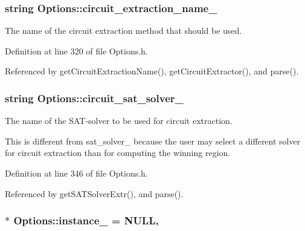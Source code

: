 \hypertarget{classOptions_a08739163aad2d558d5a96f1f27f4f7d8}{
\subsubsection[{circuit\-\_\-extraction\-\_\-name\-\_\-}]{\setlength{\rightskip}{0pt plus 5cm}string Options\-::circuit\-\_\-extraction\-\_\-name\-\_\-\hspace{0.3cm}{\ttfamily [protected]}}}\label{classOptions_a08739163aad2d558d5a96f1f27f4f7d8}


The name of the circuit extraction method that should be used. 



Definition at line 320 of file Options.\-h.



Referenced by get\-Circuit\-Extraction\-Name(), get\-Circuit\-Extractor(), and parse().

\hypertarget{classOptions_a1dc174bd99373a624a4643fd44225129}{
\subsubsection[{circuit\-\_\-sat\-\_\-solver\-\_\-}]{\setlength{\rightskip}{0pt plus 5cm}string Options\-::circuit\-\_\-sat\-\_\-solver\-\_\-\hspace{0.3cm}{\ttfamily [protected]}}}\label{classOptions_a1dc174bd99373a624a4643fd44225129}


The name of the S\-A\-T-\/solver to be used for circuit extraction. 

This is different from sat\-\_\-solver\-\_\- because the user may select a different solver for circuit extraction than for computing the winning region. 

Definition at line 346 of file Options.\-h.



Referenced by get\-S\-A\-T\-Solver\-Extr(), and parse().

\hypertarget{classOptions_a9097fb97d94616d9166bc7e8df97a58a}{
\subsubsection[{instance\-\_\-}]{ $\ast$ Options\-::instance\-\_\- = N\-U\-L\-L\hspace{0.3cm}{\ttfamily [static]}, {\ttfamily [private]}}}\label{classOptions_a9097fb97d94616d9166bc7e8df97a58a}


